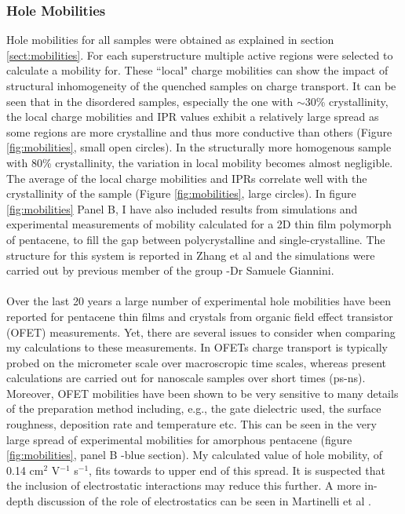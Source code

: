 \subsubsection{Hole Mobilities}
Hole mobilities for all samples were obtained as explained in section \ref{sect:mobilities}. For each superstructure multiple active regions were selected to calculate a mobility for. These ``local" charge mobilities can show the impact of structural inhomogeneity of the quenched samples on charge transport. It can be seen that in the disordered samples, especially the one with $\sim$30\% crystallinity, the local charge mobilities and IPR values exhibit a relatively large spread as some regions are more crystalline and thus more conductive than others (Figure \ref{fig:mobilities}, small open circles). In the structurally more homogenous sample with 80\% crystallinity, the variation in local mobility becomes almost negligible. The average of the local charge mobilities and IPRs correlate well with the crystallinity of the sample (Figure \ref{fig:mobilities}, large circles). In figure \ref{fig:mobilities} Panel B, I have also included results from simulations and experimental measurements of mobility calculated for a 2D thin film polymorph of pentacene, to fill the gap between polycrystalline and single-crystalline. The structure for this system is reported in Zhang et al \cite{Zhang2016TF} and the simulations were carried out by previous member of the group -Dr Samuele Giannini.
\\\\
Over the last 20 years a large number of experimental hole mobilities have been reported for pentacene thin films and crystals from organic field effect transistor (OFET) measurements. Yet, there are several issues to consider when comparing my calculations to these measurements. In OFETs charge transport is typically probed on the micrometer scale over macroscropic time scales, whereas present calculations are carried out for nanoscale samples over short times (ps-ns). Moreover, OFET mobilities have been shown to be very sensitive to many details of the preparation method including, e.g., the gate dielectric used, the surface roughness, deposition rate and temperature etc. This can be seen in the very large spread of experimental mobilities  for amorphous pentacene (figure \ref{fig:mobilities}, panel B -blue section). My calculated value of hole mobility, of 0.14 cm$^2$ V$^{-1}$ s$^{-1}$, fits towards to upper end of this spread. It is suspected that the inclusion of electrostatic interactions may reduce this further. A more in-depth discussion of the role of electrostatics can be seen in Martinelli et al \cite{ESEffectOnMob}.
